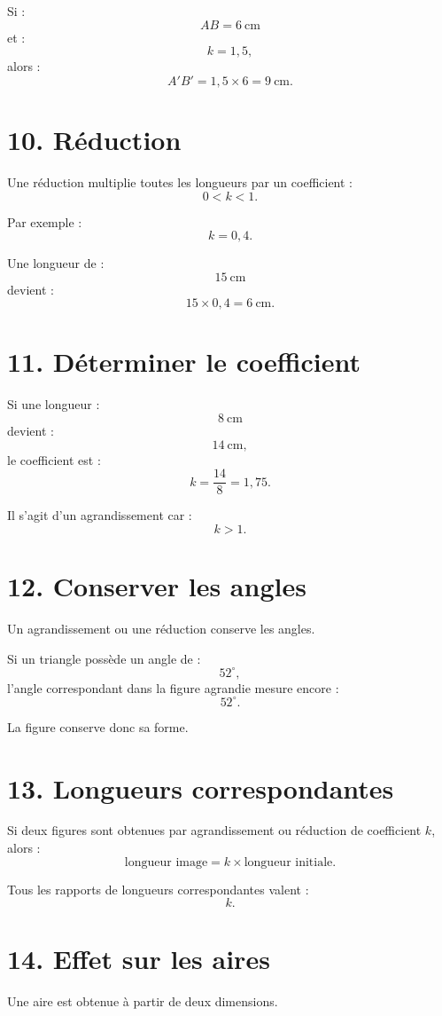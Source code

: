 Si :
\[
AB=6\ \text{cm}
\]
et :
\[
k=1{,}5,
\]
alors :
\[
A'B'=1{,}5\times6=9\ \text{cm}.
\]

\section{10. Réduction}

Une réduction multiplie toutes les longueurs par un coefficient :
\[
0<k<1.
\]

Par exemple :
\[
k=0{,}4.
\]

Une longueur de :
\[
15\ \text{cm}
\]
devient :
\[
15\times0{,}4=6\ \text{cm}.
\]

\section{11. Déterminer le coefficient}

Si une longueur :
\[
8\ \text{cm}
\]
devient :
\[
14\ \text{cm},
\]
le coefficient est :
\[
k=\dfrac{14}{8}=1{,}75.
\]

Il s'agit d'un agrandissement car :
\[
k>1.
\]

\section{12. Conserver les angles}

Un agrandissement ou une réduction conserve les angles.

Si un triangle possède un angle de :
\[
52^\circ,
\]
l'angle correspondant dans la figure agrandie mesure encore :
\[
52^\circ.
\]

La figure conserve donc sa forme.

\section{13. Longueurs correspondantes}

Si deux figures sont obtenues par agrandissement ou réduction de coefficient $k$, alors :
\[
\boxed{
\text{longueur image}=k\times\text{longueur initiale}
}.
\]

Tous les rapports de longueurs correspondantes valent :
\[
k.
\]

\section{14. Effet sur les aires}

Une aire est obtenue à partir de deux dimensions.

